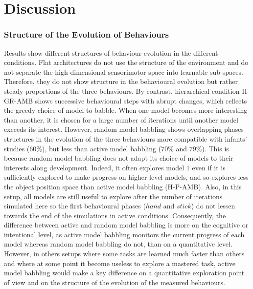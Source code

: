 \documentclass[10pt,letterpaper]{article}
\begin{document}
	
%


\section{Discussion}

	\subsubsection{Structure of the Evolution of Behaviours}
	
		Results show different structures of behaviour evolution in the different conditions.		
		Flat architectures do not use the structure of the environment and do not separate the high-dimensional sensorimotor space into learnable sub-spaces.
		Therefore, they do not show structure in the behavioural evolution but rather steady proportions of the three behaviours.
		By contrast, hierarchical condition H-GR-AMB shows successive behavioural steps with abrupt changes, which reflects the greedy choice of model to babble.
		When one model becomes more interesting than another, it is chosen
		for a large number of iterations until another model exceeds its interest.
		However, random model babbling shows overlapping phases structures in the evolution of the three behaviours more compatible with infants' studies ($60\%$), 
		but less than active model babbling ($70\%$ and $79\%$).
		This is because random model babbling does not adapt its choice of models to their interests along development.
		Indeed, it often explores model $1$ even if it is sufficiently explored to make progress on higher-level models, 
		and so explores less the object position space than active model babbling (H-P-AMB).
		Also, in this setup, all models are still useful to explore after the number of iterations simulated 
		here so the first behavioural phases ($hand$ and $stick$) do not lessen towards the end of the simulations in active conditions. 
		Consequently, the difference between active and random model babbling is more on the cognitive or intentional level, 
		as active model babbling monitors the current progress of each model whereas random model babbling do not, than on a quantitative level.
		However, in others setups where some tasks are learned much faster than others and where at some point it become useless to explore a mastered task, active model babbling would
		make a key difference on a quantitative exploration point of view and on the structure of the evolution of the measured behaviours.\\
	
\end{document}

